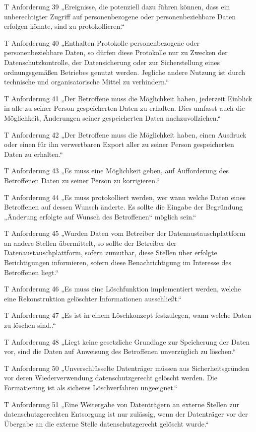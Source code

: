 T Anforderung 39
„Ereignisse, die potenziell dazu führen können, dass ein unberechtigter Zugriff auf personenbezogene oder personenbeziehbare Daten erfolgen könnte, sind zu protokollieren.“

T Anforderung 40
„Enthalten Protokolle personenbezogene oder personenbeziehbare Daten, so dürfen diese Protokolle nur zu Zwecken der Datenschutzkontrolle, der Datensicherung oder zur Sicherstellung eines ordnungsgemäßen Betriebes genutzt werden. Jegliche andere Nutzung ist durch technische und organisatorische Mittel zu verhindern.“

T Anforderung 41
„Der Betroffene muss die Möglichkeit haben, jederzeit Einblick in alle zu seiner Person gespeicherten Daten zu erhalten. Dies umfasst auch die Möglichkeit, Änderungen seiner gespeicherten Daten nachzuvollziehen.“

T Anforderung 42
„Der Betroffene muss die Möglichkeit haben, einen Ausdruck oder einen für ihn verwertbaren Export aller zu seiner Person gespeicherten Daten zu erhalten.“

T Anforderung 43
„Es muss eine Möglichkeit geben, auf Aufforderung des Betroffenen Daten zu seiner Person zu korrigieren.“

T Anforderung 44
„Es muss protokolliert werden, wer wann welche Daten eines Betroffenen auf dessen Wunsch änderte. Es sollte die Eingabe der Begründung „Änderung erfolgte auf Wunsch des Betroffenen“ möglich sein.“

T Anforderung 45
„Wurden Daten vom Betreiber der Datenaustauschplattform an andere Stellen übermittelt, so sollte der Betreiber der Datenaustauschplattform, sofern zumutbar, diese Stellen über erfolgte Berichtigungen informieren, sofern diese Benachrichtigung im Interesse des Betroffenen liegt.“

T Anforderung 46
„Es muss eine Löschfunktion implementiert werden, welche eine Rekonstruktion gelöschter Informationen ausschließt.“

T Anforderung 47
„Es ist in einem Löschkonzept festzulegen, wann welche Daten zu löschen sind..“

T Anforderung 48
„Liegt keine gesetzliche Grundlage zur Speicherung der Daten vor, sind die Daten auf Anweisung des Betroffenen unverzüglich zu löschen.“

T Anforderung 50
„Unverschlüsselte Datenträger müssen aus Sicherheitsgründen vor deren Wiederverwendung datenschutzgerecht gelöscht werden. Die Formatierung ist als sicheres Löschverfahren ungeeignet.“

T Anforderung 51
„Eine Weitergabe von Datenträgern an externe Stellen zur datenschutzgerechten Entsorgung ist nur zulässig, wenn der Datenträger vor der Übergabe an die externe Stelle datenschutzgerecht gelöscht wurde.“

